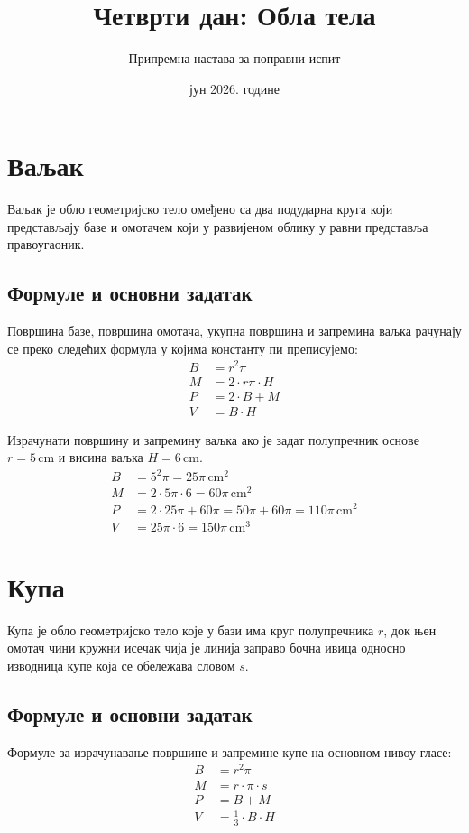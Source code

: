 \documentclass[12pt,a5paper]{article}
\title{Четврти дан: Обла тела}
\author{Припремна настава за поправни испит}
\date{јун 2026. године}
\begin{document}
\maketitle
\thispagestyle{fancy}

\tableofcontents

\section{Ваљак}

Ваљак је обло геометријско тело омеђено са два подударна круга који представљају базе и омотачем који у развијеном облику у равни представља правоугаоник.

\subsection{Формуле и основни задатак}
Површина базе, површина омотача, укупна површина и запремина ваљка рачунају се преко следећих формула у којима константу пи преписујемо:
\begin{align*}
B &= r^2 \pi \\
M &= 2 \cdot r \pi \cdot H \\
P &= 2 \cdot B + M \\
V &= B \cdot H
\end{align*}

Израчунати површину и запремину ваљка ако је задат полупречник основе $r = 5\,\mathrm{cm}$ и висина ваљка $H = 6\,\mathrm{cm}$.
\begin{align*}
B &= 5^2 \pi = 25\pi\,\mathrm{cm}^2 \\
M &= 2 \cdot 5 \pi \cdot 6 = 60\pi\,\mathrm{cm}^2 \\
P &= 2 \cdot 25\pi + 60\pi = 50\pi + 60\pi = 110\pi\,\mathrm{cm}^2 \\
V &= 25\pi \cdot 6 = 150\pi\,\mathrm{cm}^3
\end{align*}

\section{Купа}

Купа је обло геометријско тело које у бази има круг полупречника $r$, док њен омотач чини кружни исечак чија је линија заправо бочна ивица односно изводница купе која се обележава словом $s$.

\subsection{Формуле и основни задатак}
Формуле за израчунавање површине и запремине купе на основном нивоу гласе:
\begin{align*}
B &= r^2 \pi \\
M &= r \cdot \pi \cdot s \\
P &= B + M \\
V &= \frac{1}{3} \cdot B \cdot H
\end{align*}
\end{document}
